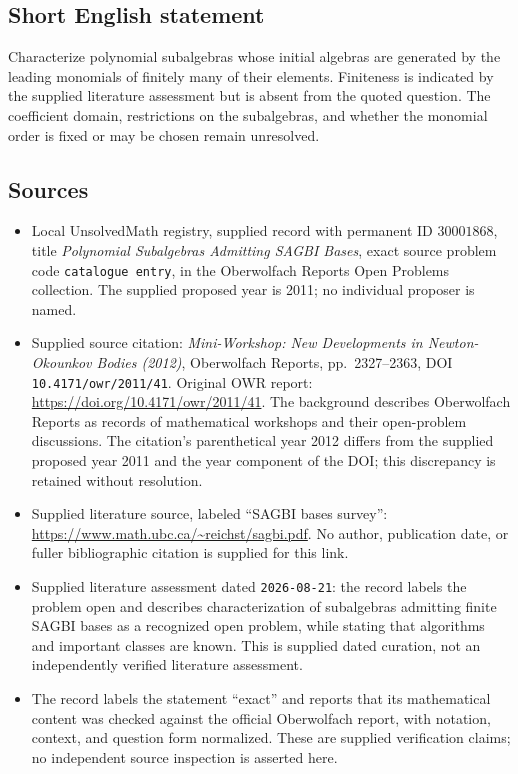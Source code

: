 \documentclass[11pt]{article}
\begin{document}
\subsection{Short English statement}
Characterize polynomial subalgebras whose initial algebras are generated by the leading monomials of finitely many of their elements. Finiteness is indicated by the supplied literature assessment but is absent from the quoted question. The coefficient domain, restrictions on the subalgebras, and whether the monomial order is fixed or may be chosen remain unresolved.
\subsection{Sources}
\begin{itemize}
\item Local UnsolvedMath registry, supplied record with permanent ID \(30001868\), title \emph{Polynomial Subalgebras Admitting SAGBI Bases}, exact source problem code \texttt{catalogue entry}, in the Oberwolfach Reports Open Problems collection. The supplied proposed year is 2011; no individual proposer is named.
\item Supplied source citation: \emph{Mini-Workshop: New Developments in Newton-Okounkov Bodies (2012)}, Oberwolfach Reports, pp.\ 2327--2363, DOI \texttt{10.4171/owr/2011/41}. Original OWR report: \url{https://doi.org/10.4171/owr/2011/41}. The background describes Oberwolfach Reports as records of mathematical workshops and their open-problem discussions. The citation's parenthetical year 2012 differs from the supplied proposed year 2011 and the year component of the DOI; this discrepancy is retained without resolution.
\item Supplied literature source, labeled ``SAGBI bases survey'': \url{https://www.math.ubc.ca/~reichst/sagbi.pdf}. No author, publication date, or fuller bibliographic citation is supplied for this link.
\item Supplied literature assessment dated \texttt{2026-08-21}: the record labels the problem open and describes characterization of subalgebras admitting finite SAGBI bases as a recognized open problem, while stating that algorithms and important classes are known. This is supplied dated curation, not an independently verified literature assessment.
\item The record labels the statement ``exact'' and reports that its mathematical content was checked against the official Oberwolfach report, with notation, context, and question form normalized. These are supplied verification claims; no independent source inspection is asserted here.
\end{itemize}
\end{document}
